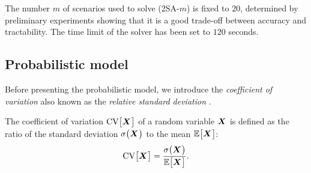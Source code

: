 The number $m$ of scenarios used to solve (2SA-$m$) is fixed to $20$, determined by preliminary experiments showing that it is a good trade-off between accuracy and tractability.
The time limit of the solver has been set to $120$ seconds.





\subsection{Probabilistic model}
\label{sec:PDP:numerical-experiments:probabilistic-model}

Before presenting the probabilistic model, we introduce the \emph{coefficient of variation} also known as the \emph{relative standard deviation} \cite{Everitt1998}.
\begin{defn}
The coefficient of variation $\CV\sqbracket{\va X}$ of a random variable $\va X$ is defined as the ratio of the standard deviation $\sigma\bracket{\va X}$ to the mean $\espe\sqbracket{\va X}$:
\begin{equation}
  \CV\sqbracket{\va X} = \frac{\sigma\bracket{\va X}}{\espe\sqbracket{\va X}}.
\end{equation}
\end{defn}


